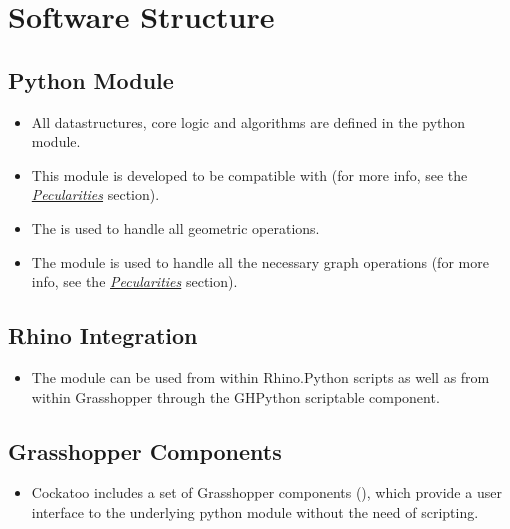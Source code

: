 \documentclass[letterpaper,10pt,english]{sphinxmanual}
\begin{document}
\section{Software Structure}
\label{\detokenize{README:software-structure}}

\subsection{Python Module}
\label{\detokenize{README:python-module}}\begin{itemize}
\item {} 
All datastructures, core logic and algorithms are defined in the
 python module.

\item {} 
This module is developed to be compatible with
 (for more info, see the
{\hyperref[\detokenize{README:pecularities}]{\emph{Pecularities}}} section).

\item {} 
The 
is used to handle all geometric operations.

\item {} 
The  module is used to handle all the necessary graph
operations (for more info, see the {\hyperref[\detokenize{README:pecularities}]{\emph{Pecularities}}}
section).

\end{itemize}


\subsection{Rhino Integration}
\label{\detokenize{README:rhino-integration}}\begin{itemize}
\item {} 
The  module can be used from within Rhino.Python scripts
as well as from within Grasshopper through the GHPython scriptable
component.

\end{itemize}


\subsection{Grasshopper Components}
\label{\detokenize{README:grasshopper-components}}\begin{itemize}
\item {} 
Cockatoo includes a set of Grasshopper components (),
which provide a user interface to the underlying python module
without the need of scripting.

\end{itemize}
\end{document}
